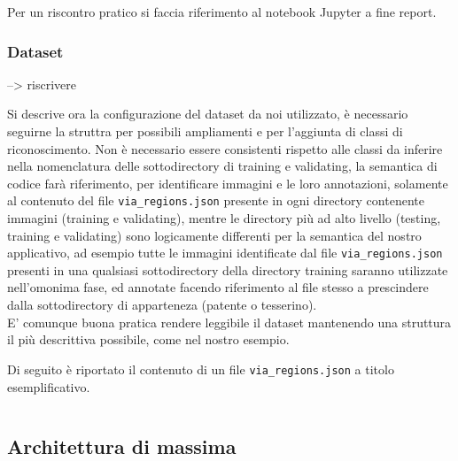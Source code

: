 \documentclass[12pt,a4paper]{article}
\begin{document}
Per un riscontro pratico si faccia riferimento al notebook Jupyter a
fine report.

\subsubsection{Dataset}

--> riscrivere %

Si descrive ora la configurazione del dataset da noi utilizzato, è necessario
seguirne la struttra per possibili ampliamenti e per l'aggiunta di classi di
riconoscimento. Non è necessario essere consistenti rispetto alle classi da
inferire nella nomenclatura delle sottodirectory di training e validating, la
semantica di codice farà riferimento, per identificare immagini e le loro
annotazioni, solamente al contenuto del file \texttt{via\_regions.json}
presente in ogni directory contenente immagini (training e validating), mentre
le directory più ad alto livello (testing, training e validating) sono
logicamente differenti per la semantica del nostro applicativo, ad esempio
tutte le immagini identificate dal file \texttt{via\_regions.json} presenti in
una qualsiasi sottodirectory della directory training saranno utilizzate
nell'omonima fase, ed annotate facendo riferimento al file stesso a prescindere
dalla sottodirectory di apparteneza (patente o tesserino).\\ E' comunque buona
pratica rendere leggibile il dataset mantenendo una struttura il più
descrittiva possibile, come nel nostro esempio.


Di seguito è riportato il contenuto di un file
\texttt{via\_regions.json} a titolo esemplificativo.

\inputminted{json}{via_regions.json}

\subsection{Architettura di massima}
\end{document}
